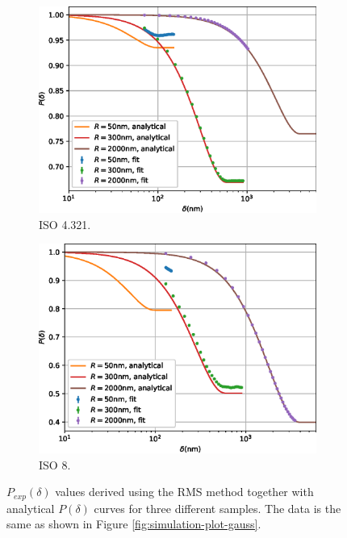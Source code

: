 \begin{figure}[p]
\begin{subfigure}[b]{0.45\textwidth}
		\includegraphics[width=\textwidth]{simulation-plot-rms-ISO-4.321}
		\caption{ISO 4.321.}
		\label{fig:simulation-plot-rms-ISO-4.321}
	\end{subfigure}
	\hfill
	\begin{subfigure}[b]{0.45\textwidth}
		\centering
		\includegraphics[width=\textwidth]{simulation-plot-rms-ISO-8}
		\caption{ISO 8.}
		\label{fig:simulation-plot-rms-ISO-8}
	\end{subfigure}
	\caption{$P_{exp}(\delta)$ values derived using the RMS method together with analytical $P(\delta)$ curves for three different samples. The data is the same as shown in Figure \ref{fig:simulation-plot-gauss}.}
	\label{fig:simulation-plot-rms}
\end{figure}

